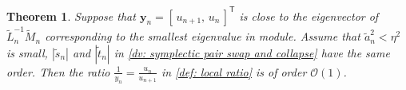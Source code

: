 \documentclass[11pt]{article}
\newcommand{\tr}{\textcolor{red}}
\newtheorem{thm}{Theorem}[section]
\numberwithin{equation}{section}
\begin{document}


\begin{thm} \label{thm: expectation of ratio}
    Suppose that $ \boldsymbol{y}_n = [\,u_{n+1},\,u_n\,]^{\mathsf{T}}$ is close to the eigenvector of $\widetilde{L}_n^{-1}\widetilde{M}_n$ corresponding to the smallest eigenvalue in module.  Assume that $\widetilde{a}_n^2 < \eta^2$ is small, $|\widetilde{s}_n|$ and $|\widetilde{t}_n|$ in \eqref{dv: symplectic pair swap and collapse} have the same order. Then the ratio $ \frac{1}{y_n} = \frac{u_n}{u_{n+1}} $ in \eqref{def: local ratio} is of order $\mathcal{O}(1)$.
\end{thm}
\end{document}
